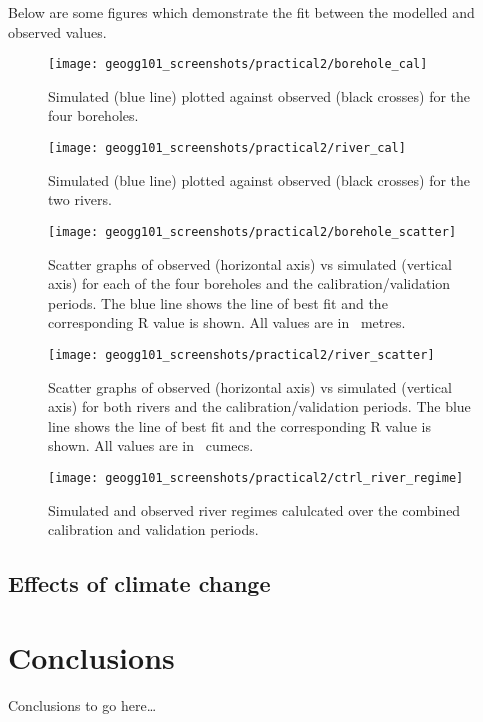 \documentclass{article}
\begin{document}
Below are some figures which demonstrate the fit between the modelled and observed values.

\begin{figure}[!h]
    \centering
    \texttt{[image: geogg101\_screenshots/practical2/borehole\_cal]}
    \caption{Simulated (blue line) plotted against observed (black crosses) for the four boreholes.}
    \label{fig:borehole_cal}
\end{figure}

\begin{figure}[!h]
    \centering
    \texttt{[image: geogg101\_screenshots/practical2/river\_cal]}
    \caption{Simulated (blue line) plotted against observed (black crosses) for the two rivers.}
    \label{fig:river_cal}
\end{figure}

\begin{figure}[!h]
    \centering
    \texttt{[image: geogg101\_screenshots/practical2/borehole\_scatter]}
    \caption{Scatter graphs of observed (horizontal axis) vs simulated (vertical axis) for each of the four boreholes and the calibration/validation periods. The blue line shows the line of best fit and the corresponding R value is shown. All values are in \SI{}{metres}.}
    \label{fig:borehole_scatter}
\end{figure}

\begin{figure}[!h]
    \centering
    \texttt{[image: geogg101\_screenshots/practical2/river\_scatter]}
    \caption{Scatter graphs of observed (horizontal axis) vs simulated (vertical axis) for both rivers and the calibration/validation periods. The blue line shows the line of best fit and the corresponding R value is shown. All values are in \SI{}{cumecs}.}
    \label{fig:river_scatter}
\end{figure}

\begin{figure}[!h]
    \centering
    \texttt{[image: geogg101\_screenshots/practical2/ctrl\_river\_regime]}
    \caption{Simulated and observed river regimes calulcated over the combined calibration and validation periods.}
    \label{fig:ctrl_river_regime}
\end{figure}

\newpage
\subsection{Effects of climate change}

\section{Conclusions}
Conclusions to go here\ldots

\printbibliography[filter=practical2]
\end{document}
